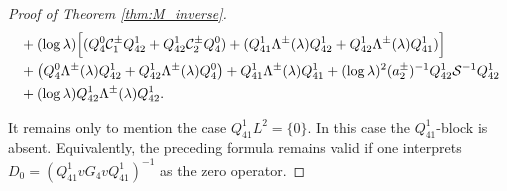 \documentclass[reqno]{amsart}
\numberwithin{equation}{section}
\begin{document}
\begin{proof}[Proof of Theorem \ref{thm:M_inverse}]
\begin{equation}
\begin{split}
				& + (\log \lambda)\Bigl[(Q_4^0 \mathcal{C}_1^\pm Q_{42}^1 +Q_{42}^1 \mathcal{C}_2^\pm Q_4^0) +(Q_{41}^1 \Lambda^\pm(\lambda) Q_{42}^1 +Q_{42}^1 \Lambda^\pm(\lambda) Q_{41}^1) \Bigr]     \\
				&+\bigl(Q_4^0 \Lambda^\pm(\lambda) Q_{42}^1 +Q_{42}^1 \Lambda^\pm(\lambda)  Q_4^0\bigr)+ Q_{41}^1 \Lambda^\pm(\lambda) Q_{41}^1 +(\log \lambda)^2 (a_2^\pm)^{-1} Q_{42}^1 \mathcal{S}^{-1} Q_{42}^1 \\
				& + (\log \lambda) Q_{42}^1 \Lambda^\pm(\lambda)Q_{42}^1.
        \end{split}
        \end{equation}

	It remains only to mention the  case $ Q_{41}^1L^2=\{0\}. $ In this case the $Q_{41}^1$-block is absent. Equivalently, the preceding formula remains valid if one interprets $D_0 = \left( Q_{41}^1vG_4vQ_{41}^1 \right)^{-1} $ as the zero operator.








\end{proof}
\end{document}
